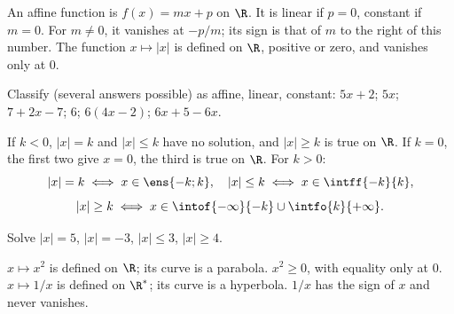 \begin{keypoint}[Definitions]
An affine function is $f(x)=mx+p$ on $\R$. It is linear if $p=0$, constant if $m=0$. For $m\ne0$, it vanishes at $-p/m$; its sign is that of $m$ to the right of this number.
The function $x\mapsto|x|$ is defined on $\R$, positive or zero, and vanishes only at $0$.
\end{keypoint}
\begin{example}Classify (several answers possible) as affine, linear, constant: $5x+2$; $5x$; $7+2x-7$; $6$; $6(4x-2)$; $6x+5-6x$.\end{example}
\begin{center}\end{center}
\begin{keypoint}
If $k<0$, $|x|=k$ and $|x|\leq k$ have no solution, and $|x|\geq k$ is true on $\R$. If $k=0$, the first two give $x=0$, the third is true on $\R$. For $k>0$:
\[|x|=k\iff x\in\ens{-k;k},\quad |x|\leq k\iff x\in\intff{-k}{k},\]
\[|x|\geq k\iff x\in\intof{-\infty}{-k}\cup\intfo{k}{+\infty}.\]
\end{keypoint}
\begin{example}Solve $|x|=5$, $|x|=-3$, $|x|\leq3$, $|x|\geq4$.\end{example}
\begin{keypoint}
$x\mapsto x^2$ is defined on $\R$; its curve is a parabola. $x^2\geq0$, with equality only at $0$.
$x\mapsto1/x$ is defined on $\R^*$; its curve is a hyperbola. $1/x$ has the sign of $x$ and never vanishes.
\end{keypoint}
\begin{center}
\end{center}
